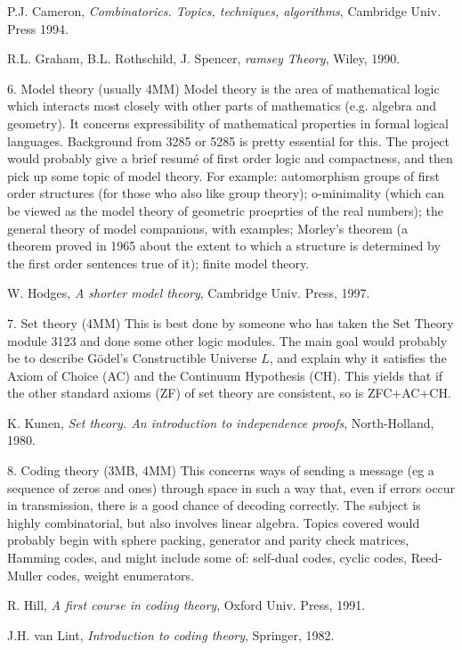 P.J. Cameron, {\em Combinatorics. Topics, techniques, algorithms}, Cambridge Univ. Press 1994.

R.L. Graham, B.L. Rothschild, J. Spencer, {\em ramsey Theory}, Wiley, 1990.

\medskip

6. Model theory (usually 4MM)
Model theory is the area of mathematical logic which interacts most closely with other parts of mathematics (e.g.
algebra and geometry). It concerns expressibility of mathematical properties in formal logical languages.
Background from 3285 or 5285 is pretty essential for this. The project would probably give a brief resum\'e of first order 
logic and compactness,
and then pick up some topic of model theory. For example: automorphism groups of first order structures (for those who also like 
group theory); o-minimality (which can be viewed as the model theory of geometric proeprties of the real numbers); the
 general theory of model companions, with examples;
Morley's theorem (a theorem proved in 1965 about the extent to which a structure is determined by the first order
 sentences true of it); finite model theory.
 
 W. Hodges, {\em A shorter model theory}, Cambridge Univ. Press, 1997.

\medskip

7. Set theory (4MM)
This is best done by someone who has taken the Set Theory module 3123 and done some other logic modules. The 
main goal would probably be to describe G\"odel's
 Constructible Universe 
$L$,
and explain why it satisfies the Axiom of Choice (AC) and the Continuum Hypothesis (CH). This yields that if the
 other standard  axioms (ZF) of set theory are consistent, so is ZFC+AC+CH.
 
K. Kunen, {\em Set theory. An introduction to independence proofs}, North-Holland, 1980. 
 
 \medskip
 
 8. Coding theory (3MB, 4MM)
 This concerns ways of sending a message (eg a sequence of zeros and ones) through space in such a way that, even if errors 
occur in
 transmission, there is a good chance of decoding correctly. The subject is highly combinatorial, but also involves linear
 algebra. 
 Topics covered would probably begin with  sphere packing, generator and parity check matrices, Hamming codes, and might 
include some of:
 self-dual codes,  cyclic codes,
 Reed-Muller codes, weight enumerators.
 
 R. Hill, {\em A first course in coding theory}, Oxford Univ. Press, 1991.
 
 J.H. van Lint, {\em Introduction to coding theory}, Springer, 1982.
    
 